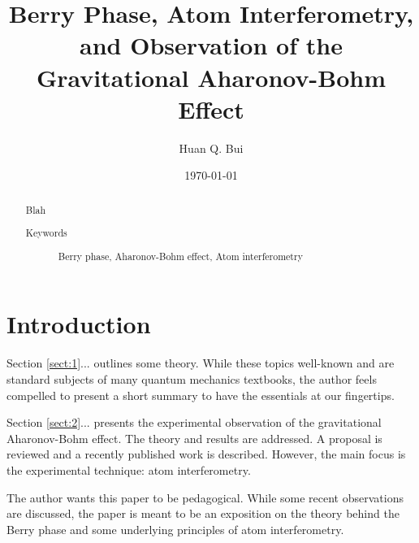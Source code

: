 \documentclass[reprint,
nofootinbib,
amsmath,amssymb,
aps]{revtex4-1}
\begin{document}
	
	
	

\title{Berry Phase, Atom Interferometry,\\ and Observation of the Gravitational Aharonov-Bohm Effect}
\author{Huan Q. Bui}
\date{\today}


\begin{abstract}
	Blah
	\begin{description}
		\item[Keywords]
		Berry phase, Aharonov-Bohm effect, Atom interferometry 
	\end{description}
\end{abstract}

\maketitle




\section{Introduction}



Section \ref{sect:1}... outlines some theory. While these topics well-known and are standard subjects of many quantum mechanics textbooks, the author feels compelled to present a short summary to have the essentials at our fingertips. 


Section \ref{sect:2}... presents the experimental observation of the gravitational Aharonov-Bohm effect. The theory and results are addressed. A proposal is reviewed and a recently published work is described. However, the main focus is the experimental technique: atom interferometry. 


The author wants this paper to be pedagogical. While some recent observations are discussed, the paper is meant to be an exposition on the theory behind the Berry phase and some underlying principles of atom interferometry. 
\end{document}
